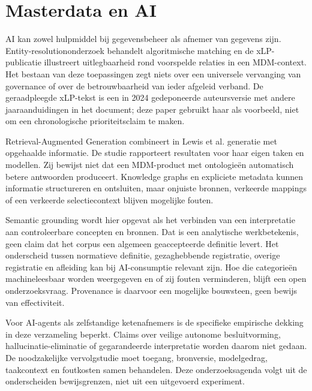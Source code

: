 \section{Masterdata en AI}
AI kan zowel hulpmiddel bij gegevensbeheer als afnemer van gegevens zijn. Entity-resolutiononderzoek behandelt algoritmische matching en de xLP-publicatie illustreert uitlegbaarheid rond voorspelde relaties in een MDM-context. Het bestaan van deze toepassingen zegt niets over een universele vervanging van governance of over de betrouwbaarheid van ieder afgeleid verband. De geraadpleegde xLP-tekst is een in 2024 gedeponeerde auteursversie met andere jaaraanduidingen in het document; deze paper gebruikt haar als voorbeeld, niet om een chronologische prioriteitsclaim te maken. \parencite{L29,L31}

Retrieval-Augmented Generation combineert in Lewis et al. generatie met opgehaalde informatie. De studie rapporteert resultaten voor haar eigen taken en modellen. Zij bewijst niet dat een MDM-product met ontologieën automatisch betere antwoorden produceert. Knowledge graphs en expliciete metadata kunnen informatie structureren en ontsluiten, maar onjuiste bronnen, verkeerde mappings of een verkeerde selectiecontext blijven mogelijke fouten. \parencite{L16,L13,S33}

Semantic grounding wordt hier opgevat als het verbinden van een interpretatie aan controleerbare concepten en bronnen. Dat is een analytische werkbetekenis, geen claim dat het corpus een algemeen geaccepteerde definitie levert. Het onderscheid tussen normatieve definitie, gezaghebbende registratie, overige registratie en afleiding kan bij AI-consumptie relevant zijn. Hoe die categorieën machineleesbaar worden weergegeven en of zij fouten verminderen, blijft een open onderzoeksvraag. Provenance is daarvoor een mogelijke bouwsteen, geen bewijs van effectiviteit. \parencite{S33,S25,L16}

Voor AI-agents als zelfstandige ketenafnemers is de specifieke empirische dekking in deze verzameling beperkt. Claims over veilige autonome besluitvorming, hallucinatie-eliminatie of gegarandeerde interpretatie worden daarom niet gedaan. De noodzakelijke vervolgstudie moet toegang, bronversie, modelgedrag, taakcontext en foutkosten samen behandelen. Deze onderzoeksagenda volgt uit de onderscheiden bewijsgrenzen, niet uit een uitgevoerd experiment.
